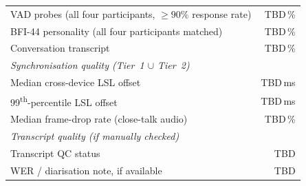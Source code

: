 \begin{table}[t]
\begin{tabular}{lr}
    VAD probes (all four participants, $\geq 90\%$ response rate)
                                                        & TBD\,\% \\
    BFI-44 personality (all four participants matched)  & TBD\,\% \\
    Conversation transcript                             & TBD\,\% \\
    \midrule
    \multicolumn{2}{l}{\textit{Synchronisation quality (Tier~1 $\cup$ Tier~2)}} \\
    \midrule
    Median cross-device LSL offset                      & TBD\,ms \\
    99\textsuperscript{th}-percentile LSL offset        & TBD\,ms \\
    Median frame-drop rate (close-talk audio)           & TBD\,\% \\
    \midrule
    \multicolumn{2}{l}{\textit{Transcript quality (if manually checked)}} \\
    \midrule
    Transcript QC status                                & TBD \\
    WER / diarisation note, if available                & TBD \\
    \bottomrule
  \end{tabular}
\end{table}
